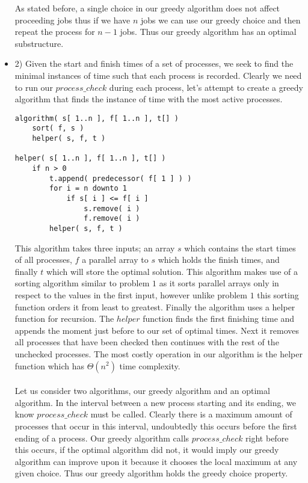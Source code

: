 \documentclass[ 12pt ]{article}
\begin{document}
\begin{itemize}
	As stated before, a single choice in our greedy algorithm does not affect proceeding
	jobs thus if we have $n$ jobs we can use our greedy choice and then repeat the
	process for $n-1$ jobs. Thus our greedy algorithm has an optimal substructure.
	\newpage

	\item[] {\large 2)}
	Given the start and finish times of a set of processes, we seek to find the
	minimal instances of time such that each process is recorded. Clearly we
	need to run our $process\_check$ during each process, let's attempt to create
	a greedy algorithm that finds the instance of time with the most active
	processes. \\

	\begin{center}
	\begin{lstlisting}
algorithm( s[ 1..n ], f[ 1..n ], t[] )
	sort( f, s )
	helper( s, f, t )

helper( s[ 1..n ], f[ 1..n ], t[] )
	if n > 0
		t.append( predecessor( f[ 1 ] ) )
		for i = n downto 1
			if s[ i ] <= f[ i ]
				s.remove( i )
				f.remove( i )
		helper( s, f, t )
	\end{lstlisting}
	\end{center}

	This algorithm takes three inputs; an array $s$ which contains the start
	times of all processes, $f$ a parallel array to $s$ which holds the finish
	times, and finally $t$ which will store the optimal solution. This algorithm
	makes use of a sorting algorithm similar to problem $1$ as it sorts parallel
	arrays only in respect to the values in the first input, however unlike problem
	$1$ this sorting function orders it from least to greatest. Finally the
	algorithm uses a helper function for recursion. The $helper$ function
	finds the first finishing time and appends the moment just before to our
	set of optimal times. Next it removes all processes that have been checked
	then continues with the rest of the unchecked processes. The most costly
	operation in our algorithm is the helper function which has $\Theta(n^2)$
	time complexity. \\ \\

	Let us consider two algorithms, our greedy algorithm and an optimal algorithm.
	In the interval between a new process starting and its ending, we know
	$process\_check$ must be called. Clearly there is a maximum amount of processes
	that occur in this interval, undoubtedly this occurs before the first ending of
	a process. Our greedy algorithm calls $process\_check$ right before this occurs,
	if the optimal algorithm did not, it would imply our greedy algorithm can improve
	upon it because it chooses the local maximum at any given choice. Thus our greedy
	algorithm holds the greedy choice property. \\ \\


\end{itemize}
\end{document}
